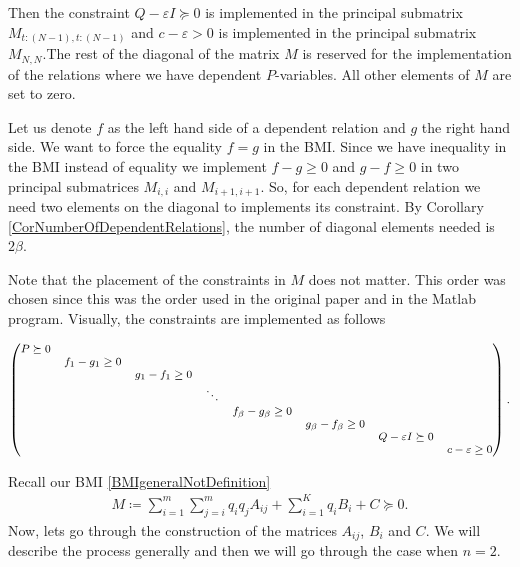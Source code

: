 \documentclass[a4paper,12pt,twoside,BCOR=10mm]{scrbook}
\begin{document}
Then the constraint $Q - \varepsilon I\succeq 0$ is implemented in the principal submatrix \textsc{$M_{t:(N-1), t:(N-1)}$} and $c - \varepsilon > 0$ is implemented in the principal submatrix $M_{N,N}$.The rest of the diagonal of the matrix $M$ is reserved for the implementation of the relations where we have dependent $P$-variables. All other elements of $M$ are set to zero.

Let us denote $f$ as the left hand side of a dependent relation and $g$ the right hand side. We want to force the equality $f = g$ in the BMI. Since we have inequality in the BMI instead of equality we implement $f - g \geq 0$ and $g - f \geq 0$ in two principal submatrices $M_{i,i}$ and $M_{i+1,i+1}$. So, for each dependent relation we need two elements on the diagonal to implements its constraint. By Corollary \ref{CorNumberOfDependentRelations}, the number of diagonal elements needed is $2\beta$.

Note that the placement of the constraints in $M$ does not matter. This order was chosen since this was the order used in the original paper \citep{Ha2019BMI} and in the Matlab program. Visually, the constraints are implemented as follows

\begin{align*}
\footnotesize{
    \begin{pmatrix}
    P \succeq 0 & & & & & & &\\
      & f_1 - g_1 \geq 0 & & & & & &\\
      & & g_1 - f_1 \geq 0 & & & & &\\
      & & & \ddots & & & &\\
      & & & & f_\beta - g_\beta \geq 0 & & &\\
      & & & & & g_\beta - f_\beta \geq 0 & &\\
      & & & & & & Q - \varepsilon I \succeq 0 &\\
      & & & & & & & c - \varepsilon \geq 0
    \end{pmatrix}.
    }
\end{align*}

Recall our BMI \eqref{BMIgeneralNotDefinition}
\begin{align*}
    M \coloneqq \sum\limits_{i = 1}^m \sum\limits_{j = i}^m q_iq_j A_{ij} + \sum\limits_{i = 1}^K q_iB_i + C \succeq 0.
\end{align*}
Now, lets go through the construction of the matrices $A_{ij}$, $B_i$ and $C$. We will describe the process generally and then we will go through the case when $n = 2$.
\end{document}
